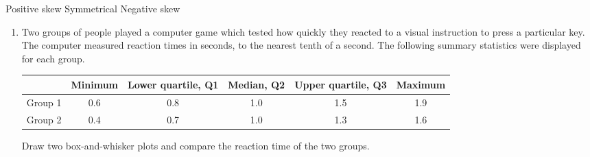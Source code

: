 \medskip
\vspace{3cm}

Positive skew  \hspace{4.2cm} Symmetrical  \hspace{4.2cm} \hfill Negative skew

\exercise  %

\begin{enumerate}
	\item Two groups of people played a computer game which tested  how quickly they reacted to a  visual instruction to press a particular key. The computer measured reaction times in seconds, to the nearest tenth of a second. The following summary statistics were displayed for each group.
	
	\begin{table}[!htpb]
		\centering
		\begin{tabular}{|l|c|c|c|c|c|} 
			\cline{2-6}
			\multicolumn{1}{l|}{} & Minimum & Lower quartile, Q1 & Median, Q2 & Upper quartile, Q3 & Maximum  \\ 
			\hline
			Group 1               & 0.6     & 0.8                & 1.0        & 1.5                & 1.9      \\ 
			\hline
			Group 2               & 0.4     & 0.7                & 1.0        & 1.3                & 1.6      \\
			\hline
		\end{tabular}
	\end{table}

Draw two box-and-whisker plots and compare the reaction time of the two groups.



\end{enumerate}
